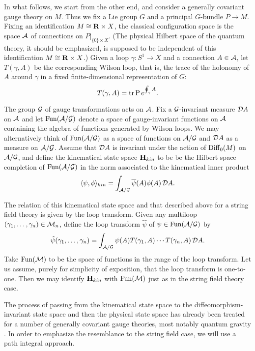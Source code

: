 \documentclass[12pt]{article}
\newcommand{\maps}{\colon}
\newcommand{\A}{{\cal A}}
\newcommand{\G}{{\cal G}}
\newcommand{\M}{{\cal M}}
\newcommand{\D}{{\cal D}}
\renewcommand{\H}{{\bf H}}
\newcommand{\R}{{\bf R}}
\newcommand{\tr}{{\rm tr}}
\newcommand{\Diff}{{\rm Diff}}
\newcommand{\Fun}{{\rm Fun}}
\begin{document}
In what follows, we start from the other end, and
consider a generally covariant gauge theory on $M$.
Thus we fix a Lie group $G$ and a principal $G$-bundle $P \to M$.
Fixing an identification $M \cong \R \times X$, the
classical configuration space is the space $\A$ of
connections on $P|_{\{0\} \times X}$.  (The physical Hilbert space of
the quantum theory, it should be emphasized, is supposed to be
independent of this identification $M \cong \R \times X$.)
Given a loop $\gamma \maps S^1 \to X$ and a connection $A\in \A$,
let $T(\gamma,A)$ be the corresponding Wilson loop, that is,
the trace of the holonomy of $A$ around $\gamma$ in a fixed
finite-dimensional representation of $G$:
\[           T(\gamma,A) = \tr\, {\rm P}\, e^{ \oint_\gamma A } . \]

The group $\G$ of gauge transformations acts on $\A$. Fix a
$\G$-invariant measure $\D A$
on $\A$ and let $\Fun(\A/\G)$ denote a space of gauge-invariant
functions on $\A$
containing the algebra of functions generated by Wilson loops.   We may
alternatively think of $\Fun(\A/\G)$ as a space of
functions on $\A/\G$ and $\D A$ as a measure on $\A/\G$.
Assume that $\D A$ is invariant under the action of
$\Diff_0(M)$ on $\A/\G$, and define the kinematical state space $\H_{kin}$
to be be the Hilbert space completion of $\Fun(\A/\G)$ in the norm
associated to the kinematical inner product
\[ \langle \psi,\phi\rangle_{kin} = \int_{\A/\G}
\overline\psi(A) \phi(A) \, \D A  .\]

The relation of this kinematical state space and that described above
for a string field theory is given by the loop transform.
Given any multiloop $(\gamma_1, \dots, \gamma_n) \in \M_n$, define the loop
transform $\hat\psi$ of $\psi\in \Fun(\A/\G)$ by
\[            \hat\psi(\gamma_1, \dots, \gamma_n) =
\int_{\A/\G} \psi(A) T(\gamma_1,A) \cdots T(\gamma_n,A) \, \D A  .\]
Take $\Fun(\M)$ to be the space of functions in the range of the loop
transform.  Let us assume, purely for simplicity of exposition, that the
loop transform is one-to-one.  Then we may identify $\H_{kin}$ with
$\Fun(\M)$ just as in the string field theory case.

The process of passing from the kinematical state space to the
diffeomorphism-invariant state space and then the physical state space
has already been treated for a number of generally covariant gauge
theories, most notably quantum gravity \cite{A,Rovelli,RS}.
In order to emphasize the resemblance to the
string field case, we will use a path integral approach.
\end{document}
